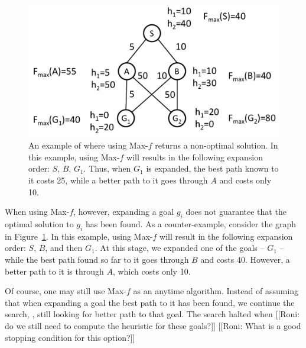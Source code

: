 \documentclass{aicom2e}
\begin{document}
 \begin{figure}
 \includegraphics[width=\columnwidth]{max-bad_cropped.pdf}      
 \caption{An example of where using Max-$f$ returns a non-optimal solution. In this example, 
 using Max-$f$ will results in the following expansion order: $S$, $B$, $G_1$. 
 Thus, when $G_1$ is expanded, the best path known to it costs 25, while a 
 better path to it goes through $A$ and costs only 10.}
 \label{fig:max-bad}
 \end{figure}
 
 When using Max-$f$, however, expanding a goal $g_i$ does not guarantee
 that the optimal solution to $g_i$ has been found. As a counter-example, consider 
 the graph in Figure~\ref{fig:max-bad}.
 In this example, using Max-$f$ will result in the following expansion order: $S$, $B$, and then $G_1$. At this stage, we expanded one of the goals -- $G_1$ -- while the best path found so far to it goes through $B$ and costs 40. However, a better path to it is through $A$, which costs only 10.
 
 
 Of course, one may still use Max-$f$ as an anytime algorithm. 
 Instead of assuming that when expanding a goal the best path to it has been found, we continue the search, , still looking for better path to that goal. The search halted when 
 [[Roni: do we still need to compute the heuristic for these goals?]]
 [[Roni: What is a good stopping condition for this option?]]
 
\end{document}
